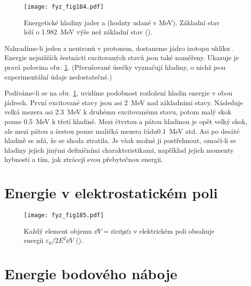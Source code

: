     \begin{figure}[ht!]  %
      \centering
      \texttt{[image: fyz\_fig184.pdf]}
      \caption{Energetické hladiny jader  a  (hodnty udané v
              \si{\mega\electronvolt}). Základní stav  leží o
              \SI{1.982}{\mega\electronvolt} výše než základní stav 
              (\cite[s.~149]{Feynman02}).}
      \label{fyz:fig184}
    \end{figure}

    Nahradíme-li jeden z neutronů v  protonem, dostaneme jádro izotopu uhlíku .
    Energie nejnižších šestnácti excitovaných stavů  jsou také naměřeny. Ukazuje je pravá
    polovina obr. \ref{fyz:fig184}. (Přerušované úsečky vyznačují hladiny, o nichž jsou
    experimentální údaje nedostatečné.)

    Podíváme-li se na obr. \ref{fyz:fig184}, uvidíme podobnost rozložení hladin energie v obou
    jádrech. První excitované stavy jsou asi \SI{2}{\mega\electronvolt} nad základními stavy.
    Následuje velká mezera asi \SI{2.3}{\mega\electronvolt} k druhému excitovanému stavu, potom malý
    skok pouze \SI{0.5}{\mega\electronvolt} k třetí hladině. Mezi čtvrtou a pátou hladinou je opět
    velký skok, ale mezi pátou a šestou pouze maličká mezera řádu\SI{0.1}{\mega\electronvolt} atd.
    Asi po desáté hladině se zdá, že se shoda ztratila. Je však možné ji postřehnout, označí-li se
    hladiny jejich jinými definičními charakteristikami, například jejich momenty hybnosti a tím,
    jak ztrácejí svou přebytečnou energii.

    
  \section{Energie v elektrostatickém poli}\label{fyz:IIchapVIsecV}

    \begin{figure}[ht!]  %
      \centering
      \texttt{[image: fyz\_fig185.pdf]}
      \caption{Každý element objemu \(\dd{V} = \dd{x}\dd{y}\dd{z}\) v elektrickém  poli obsahuje
      energii \(\varepsilon_0/2E^2\dd{V}\) (\cite[s.~154]{Feynman02}).}
      \label{fyz:fig185}
    \end{figure}
    
  \section{Energie bodového náboje}\label{fyz:IIchapVIsecVI}

